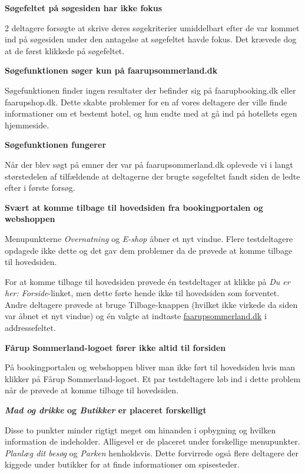 \documentclass[10pt,a4paper]{article}      %
\newcommand\pic[1]{\texttt{[image: Pics/\#1]}}
\renewcommand\good{\pic{good}}
\renewcommand\smallproblem{\pic{smallproblem}}
\renewcommand\seriousproblem{\pic{seriousproblem}}
\begin{document}
\begin{kommentarer}
\item[\smallproblem]{\textbf{Søgefeltet på søgesiden har ikke fokus}}

2 deltagere forsøgte at skrive deres søgekriterier umiddelbart efter de var kommet ind på
søgesiden under den antagelse at søgefeltet havde fokus. Det krævede dog at de først klikkede
på søgefeltet.

\item[\seriousproblem]{\textbf{Søgefunktionen søger kun på faarupsommerland.dk}}

Søgefunktionen finder ingen resultater der befinder sig på faarupbooking.dk eller faarupshop.dk. Dette skabte problemer for en af vores deltagere der ville finde informationer om et bestemt hotel, og hun endte med at gå ind på hotellets egen hjemmeside.

\item[\good]{\textbf{Søgefunktionen fungerer}}

Når der blev søgt på emner der var på faarupsommerland.dk oplevede vi i langt størstedelen af tilfældende at deltagerne der brugte søgefeltet fandt siden de ledte efter i første forsøg.

\item[\smallproblem]{\textbf{Svært at komme tilbage til hovedsiden fra bookingportalen og webshoppen}}

Menupunkterne \emph{Overnatning} og \emph{E-shop} åbner et nyt vindue. Flere testdeltagere
opdagede ikke dette og det gav dem problemer da de prøvede at komme tilbage til hovedsiden.

For at komme tilbage til hovedsiden prøvede én testdeltager at klikke på \emph{Du er her:
Forside}-linket, men dette førte hende ikke til hovedsiden som forventet. Andre deltagere
prøvede at bruge Tilbage-knappen (hvilket ikke virkede da siden var åbnet et nyt vindue)
og én valgte at indtaste \url{faarupsommerland.dk} i addressefeltet.

\item[\smallproblem]{\textbf{Fårup Sommerland-logoet fører ikke altid til forsiden}}

På bookingportalen og webshoppen bliver man ikke ført til hovedsiden hvis man klikker på Fårup
Sommerland-logoet. Et par testdeltagere løb ind i dette problem når de prøvede at komme
tilbage til hovedsiden.

\item[\smallproblem] \textbf{\emph{Mad og drikke} og \emph{Butikker} er placeret forskelligt}

Disse to punkter minder rigtigt meget om hinanden i opbygning og hvilken information de indeholder. Alligevel er de placeret under forskellige menupunkter. \emph{Planlæg dit besøg} og \emph{Parken} henholdsvis. Dette forvirrede også flere deltagere der kiggede under butikker for at finde informationer om spisesteder.

\end{kommentarer}
\end{document}
